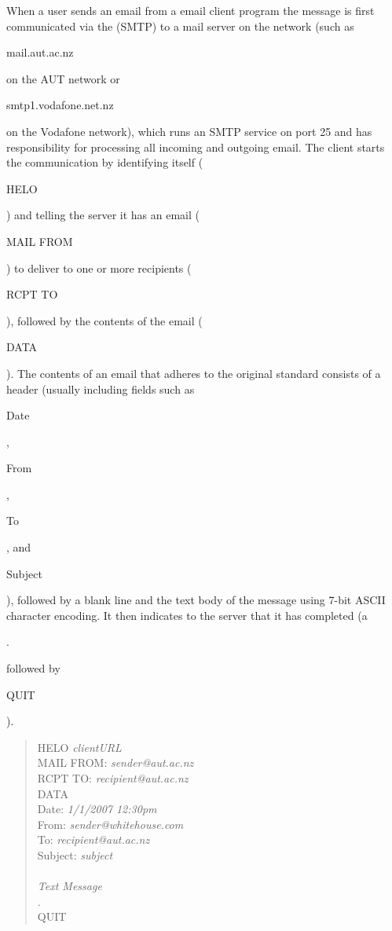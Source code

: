 
When a user sends an email from a email client program
the message is first communicated via the  (SMTP)
to a mail server on the network
(such as \begin{code}mail.aut.ac.nz\end{code} on the AUT network
or \begin{code}smtp1.voda\-fone.net.nz\end{code} on the Vodafone network),
which runs an SMTP service on port 25 and has responsibility for processing all
incoming and outgoing email.
The client starts the communication by identifying itself (\begin{code}HELO\end{code})
and telling the server it has an email (\begin{code}MAIL FROM\end{code}) to deliver to
one or more recipients (\begin{code}RCPT TO\end{code}), followed by the contents
of the email (\begin{code}DATA\end{code}).
The contents of an email that adheres to the original  standard
consists of a header (usually including fields such
as \begin{code}Date\end{code}, \begin{code}From\end{code}, \begin{code}To\end{code},
and \begin{code}Subject\end{code}), followed by a blank line and the text body
of the message using 7-bit ASCII character encoding.
It then indicates to the server that it has completed
(a \begin{code}.\end{code} followed by \begin{code}QUIT\end{code}).
\begin{quote}\begin{code}
HELO \emph{clientURL} \\
MAIL FROM: \emph{sender@aut.ac.nz} \\
RCPT TO: \emph{recipient@aut.ac.nz} \\
DATA \\
Date: \emph{1/1/2007 12:30pm} \\
From: \emph{sender@whitehouse.com} \\
To: \emph{recipient@aut.ac.nz} \\
Subject: \emph{subject} \\
\\
\emph{Text Message} \\
. \\
QUIT \\
\end{code}\end{quote}
